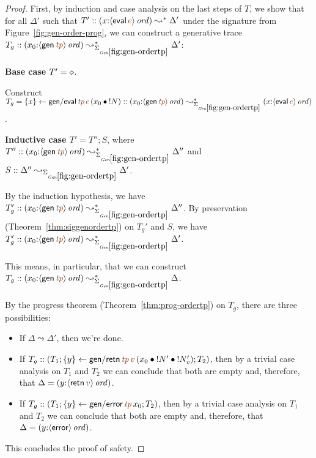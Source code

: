 \begin{proof}

  First, by induction and case analysis on the last steps of $T$, we show
  that for all $\Delta'$ such that $T' :: (x{:}\istrue{\susp{{\sf
        eval}\,\lf{e}}}) \leadsto^* \Delta'$ under the signature
  from Figure~\ref{fig:gen-order-prog}, we can construct
  a generative trace $T_g :: (x_0{:}\istrue{\susp{{\sf
        gen}\,\lf{{\it tp}}}}) \leadsto^*_{\siggenordertp} \Delta'$:

  \bigskip
  \noindent
  {\bf Base case $T' = \diamond$}.

  \smallskip
  \noindent
  Construct
  $T_g = \trstep{x}{{\sf gen/eval}\,\lf{{\it tp}}\,\lf{e}\,(\tfuser{x_0}{\tbangr{N}})}:: (x_0{:}\istrue{\susp{{\sf gen}\,\lf{{\it tp}}}})
  \leadsto^*_{\siggenordertp} (x{:}\istrue{\susp{{\sf
        eval}\,\lf{e}}})$.

  \bigskip
  \noindent
  {\bf Inductive case $T' = T''; S$}, where $T'' :: (x_0{:}\istrue{\susp{{\sf gen}\,\lf{{\it tp}}}}) \leadsto^*_{\siggenordertp} \Delta''$ and $S :: \Delta'' \leadsto_{\siggenordertp} \Delta'$. 

  \smallskip
  \noindent
  By the induction hypothesis, we have $T_g' :: (x_0{:}\istrue{\susp{{\sf gen}\,\lf{{\it tp}}}}) \leadsto_{\siggenordertp}^*
  \Delta''$. By preservation (Theorem~\ref{thm:siggenordertp}) on 
  $T_g'$ and $S$, we have $T_g' :: (x_0{:}\istrue{\susp{{\sf gen}\,\lf{{\it tp}}}}) \leadsto_{\siggenordertp}^*
  \Delta'$.

  \bigskip
  \noindent
  This means, in particular, that we can construct 
  $T_g :: (x_0{:}\istrue{\susp{{\sf gen}\,\lf{{\it tp}}}}) \leadsto_{\siggenordertp}^*
  \Delta$. 

  \bigskip
  \noindent
  By the progress theorem (Theorem~\ref{thm:prog-ordertp}) on $T_g$, 
  there are three possibilities:
  \begin{itemize}
  \item If $\Delta \leadsto \Delta'$, then we're done.
  \item If $T_g :: (T_1; \trstep{y}{{\sf gen/retn}\,\lf{{\it tp}}\,\lf{v}\,(\tfuser{x_0}{\tfuser{\tbangr{N'}}{\tbangr{N_v'}}})}; T_2)$, then by a trivial case analysis on $T_1$ and $T_2$ we can conclude that both are empty and, therefore, that $\Delta = (y{:}\istrue{\susp{{\sf retn}\,\lf{v}}})$.
  \item If $T_g :: (T_1; \trstep{y}{{\sf gen/error}\,\lf{{\it tp}}\,x_0}; T_2)$, then by a trivial case analysis on $T_1$ and $T_2$ we can conclude that both are empty and, therefore, that $\Delta = (y{:}{\langle {{\sf error}} \rangle}\,{{\it ord}})$.
  \end{itemize}

  \noindent
  This concludes the proof of safety.
\end{proof}